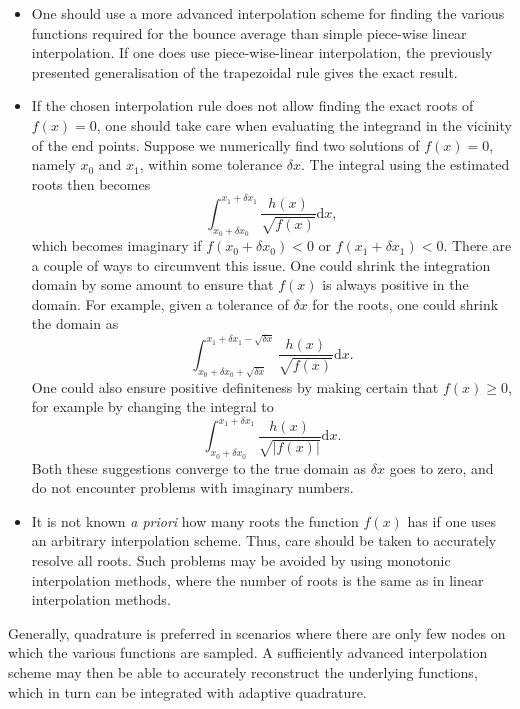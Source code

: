 \begin{itemize}
    \item One should use a more advanced interpolation scheme for finding the various functions required for the bounce average than simple piece-wise linear interpolation. If one does use piece-wise-linear interpolation, the previously presented generalisation of the trapezoidal rule gives the exact result. 
    \item If the chosen interpolation rule does not allow finding the exact roots of $f(x)=0$, one should take care when evaluating the integrand in the vicinity of the end points. Suppose we numerically find two solutions of $f(x)=0$, namely $x_0$ and $x_1$, within some tolerance $\delta x$. The integral using the estimated roots then becomes
    \begin{equation}
        \int_{x_0 + \delta x_0}^{x_1 + \delta x_1} \frac{h(x)}{\sqrt{f(x)}} \mathrm{d}x,
    \end{equation}
    which becomes imaginary if $f(x_0+ \delta x_0)<0$ or $f(x_1 + \delta x_1)<0$. There are a couple of ways to circumvent this issue. One could shrink the integration domain by some amount to ensure that $f(x)$ is always positive in the domain. For example, given a tolerance of $\delta x$ for the roots, one could shrink the domain as
    \begin{equation}
        \int_{x_0 + \delta x_0+\sqrt{\delta x}}^{x_1 + \delta x_1-\sqrt{\delta x}} \frac{h(x)}{\sqrt{f(x)}} \mathrm{d}x.
    \end{equation}
    One could also ensure positive definiteness by making certain that $f(x)\geq0$, for example by changing the integral to
    \begin{equation}
        \int_{x_0 + \delta x_0}^{x_1 + \delta x_1} \frac{h(x)}{\sqrt{|f(x)|}} \mathrm{d}x.
    \end{equation}
    Both these suggestions converge to the true domain as $\delta x$ goes to zero, and do not encounter problems with imaginary numbers.
    \item It is not known \emph{a priori} how many roots the function $f(x)$ has if one uses an arbitrary interpolation scheme. Thus, care should be taken to accurately resolve all roots. Such problems may be avoided by using monotonic interpolation methods, where the number of roots is the same as in linear interpolation methods. 
\end{itemize}
Generally, quadrature is preferred in scenarios where there are only few nodes on which the various functions are sampled. A sufficiently advanced interpolation scheme may then be able to accurately reconstruct the underlying functions, which in turn can be integrated with adaptive quadrature. \par 
